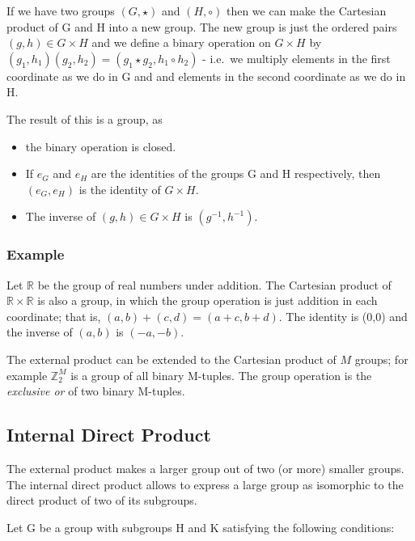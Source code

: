 

If we have two groups \((G, \star)\) and \((H, \circ)\) then we can make
the Cartesian product of G and H into a new group. The new group is just
the ordered pairs \((g, h) \in G \times H\) and we define a binary
operation on \(G \times H\) by
\((g_1, h_1)(g_2, h_2) = (g_1 \star g_2, h_1 \circ h_2)\) - i.e.~we
multiply elements in the first coordinate as we do in G and and elements
in the second coordinate as we do in H.

The result of this is a group, as

\begin{itemize}
\item
  the binary operation is closed.
\item
  If \(e_G\) and \(e_H\) are the identities of the groups G and H
  respectively, then \((e_G, e_H)\) is the identity of \(G \times H\).
\item
  The inverse of \((g, h) \in G\times H\) is \((g^{-1}, h^{-1})\).
\end{itemize}

\subsubsection{Example}\label{example}

Let \(\mathbb{R}\) be the group of real numbers under addition. The
Cartesian product of \(\mathbb{R} \times \mathbb{R}\) is also a group,
in which the group operation is just addition in each coordinate; that
is, \((a, b) + (c, d) = (a + c, b + d)\). The identity is (0,0) and the
inverse of \((a, b)\) is \((-a, -b)\).

The external product can be extended to the Cartesian product of \(M\)
groups; for example \(\mathbb{Z}_2^M\) is a group of all binary
M-tuples. The group operation is the \emph{exclusive or} of two binary
M-tuples.

\subsection{Internal Direct Product}\label{internal-direct-product}

The external product makes a larger group out of two (or more) smaller
groups. The internal direct product allows to express a large group as
isomorphic to the direct product of two of its subgroups.

Let G be a group with subgroups H and K satisfying the following
conditions:

